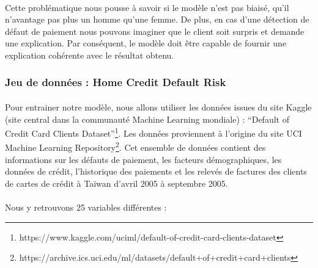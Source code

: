 \documentclass[10pt, french, a4paper]{report}
\begin{document}
\paragraph{}
Cette problématique nous pousse à savoir si le modèle n'est pas biaisé, qu'il n'avantage pas plus un homme qu'une femme. De plus, en cas d'une détection de défaut de paiement nous pouvons imaginer que le client soit surpris et demande une explication. Par conséquent, le modèle doit être capable de fournir une explication cohérente avec le résultat obtenu. 
 

\subsubsection{Jeu de données : Home Credit Default Risk}

\paragraph{}
Pour entrainer notre modèle, nous allons utiliser les données issues du site Kaggle (site central dans la communauté Machine Learning mondiale) : ``Default of Credit Card Clients Dataset''\footnote{https://www.kaggle.com/uciml/default-of-credit-card-clients-dataset}. Les données proviennent à l'origine du site UCI Machine Learning Repository\footnote{https://archive.ics.uci.edu/ml/datasets/default+of+credit+card+clients}. Cet ensemble de données contient des informations sur les défauts de paiement, les facteurs démographiques, les données de crédit, l'historique des paiements et les relevés de factures des clients de cartes de crédit à Taïwan d'avril 2005 à septembre 2005.


\paragraph{}
Nous y retrouvons 25 variables différentes :
\end{document}

